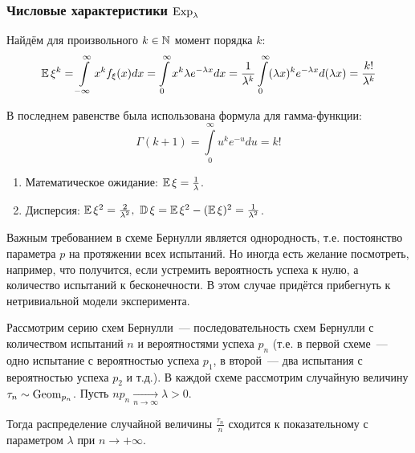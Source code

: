 \subsubsection{Числовые характеристики $\operatorname{\mathrm{Exp}}_{\lambda}$}

Найдём для произвольного $k \in \mathbb{N}$ момент порядка $k$:
\begin{equation*}
    \operatorname{\mathbb{E}} \xi^{k}=\int\limits_{-\infty}^{\infty} x^{k} f_{\xi}(x) d x=\int\limits_{0}^{\infty} x^{k} \lambda e^{-\lambda x} d x=\frac{1}{\lambda^{k}} \int\limits_{0}^{\infty}(\lambda x)^{k} e^{-\lambda x} d(\lambda x)=\frac{k !}{\lambda^{k}}
\end{equation*}

В последнем равенстве была использована формула для гамма-функции:
\begin{equation*}
    \Gamma(k+1)=\int\limits_{0}^{\infty} u^{k} e^{-u} d u=k !
\end{equation*}
\begin{enumerate}
    \item Математическое ожидание: $\operatorname{\mathbb{E}} \xi=\frac{1}{\lambda}$.
    \item Дисперсия: $\operatorname{\mathbb{E}} \xi^{2}=\frac{2}{\lambda^{2}}, ~ \operatorname{\mathbb{D}} \xi=\operatorname{\mathbb{E}} \xi^{2}-(\operatorname{\mathbb{E}} \xi)^{2}=\frac{1}{\lambda^{2}}$.
\end{enumerate}

Важным требованием в схеме Бернулли является однородность, т.е. постоянство параметра $p$ на протяжении всех испытаний.
Но иногда есть желание посмотреть, например, что получится, если устремить вероятность успеха к нулю, а количество испытаний к бесконечности. В этом случае придётся прибегнуть к нетривиальной модели эксперимента.
\begin{thm*}
    Рассмотрим серию схем Бернулли~--- последовательность схем Бернулли с количеством испытаний $n$ и вероятностями успеха $p_n$ (т.е. в первой схеме~--- одно испытание с вероятностью успеха $p_1$, в второй~--- два испытания с вероятностью успеха $p_2$ и т.д.). В каждой схеме рассмотрим случайную величину $\tau_n \sim \operatorname{\mathrm{Geom}}_{p_n}$.
    Пусть $n p_n \xrightarrow[n \to \infty]{} \lambda > 0$.

    Тогда распределение случайной величины $\frac{\tau_n}{n}$ сходится к показательному с параметром $\lambda$ при $n \to +\infty$.
\end{thm*}

